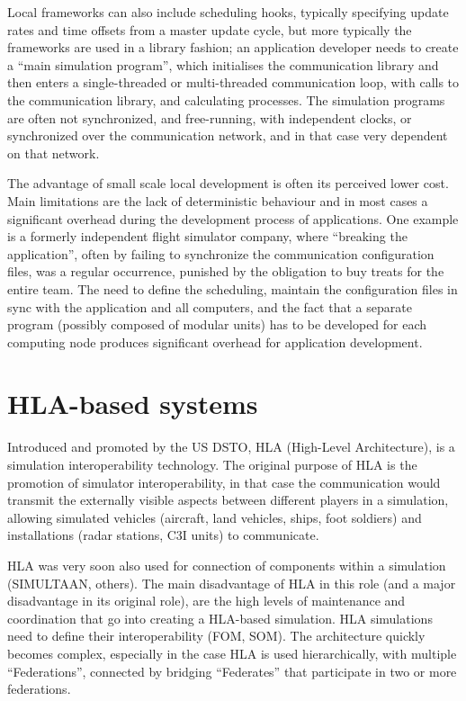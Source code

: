 \documentclass[11pt,a4paper,twoside]{scrreprt}
\begin{document}
Local frameworks can also include scheduling hooks, typically specifying update rates and time offsets from a master update cycle, but more typically the frameworks are used in a library fashion; an application developer needs to create a ``main simulation program'', which initialises the communication library and then enters a single-threaded or multi-threaded communication loop, with calls to the communication library, and calculating processes. The simulation programs are often not synchronized, and free-running, with independent clocks, or synchronized over the communication network, and in that case very dependent on that network.%

The advantage of small scale local development is often its perceived lower cost. Main limitations are the lack of deterministic behaviour and in most cases a significant overhead during the development process of applications. One example is a formerly independent flight simulator company, where ``breaking the application'', often by failing to synchronize the communication configuration files, was a regular occurrence, punished by the obligation to buy treats for the entire team. The need to define the scheduling, maintain the configuration files in sync with the application and all computers, and the fact that a separate program (possibly composed of modular units) has to be developed for each computing node produces significant overhead for application development.

\section{HLA-based systems}

Introduced and promoted by the US DSTO, HLA (High-Level Architecture), is a simulation interoperability technology. The original purpose of HLA is the promotion of simulator interoperability, in that case the communication would transmit the externally visible aspects between different players in a simulation, allowing simulated vehicles (aircraft, land vehicles, ships, foot soldiers) and installations (radar stations, C3I units) to communicate.

HLA was very soon also used for connection of components within a simulation (SIMULTAAN, others). The main disadvantage of HLA in this role (and a major disadvantage in its original role), are the high levels of maintenance and coordination that go into creating a HLA-based simulation. HLA simulations need to define their interoperability (FOM, SOM). The architecture quickly becomes complex, especially in the case HLA is used hierarchically, with multiple ``Federations'', connected by bridging ``Federates'' that participate in two or more federations.
\end{document}
